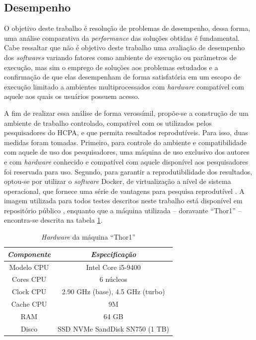 \documentclass[cic,tc]{iiufrgs}
\begin{document}
\subsection{Desempenho}

O objetivo deste trabalho é resolução de problemas de desempenho, dessa forma,
uma análise comparativa da \textit{performance} das soluções obtidas é
fundamental. Cabe ressaltar que não é objetivo deste trabalho uma avaliação de
desempenho dos \textit{softwares} variando fatores como ambiente de execução ou
parâmetros de execução, mas sim o emprego de soluções aos problemas estudados e
a confirmação de que elas desempenham de forma satisfatória em um escopo de
execução limitado a ambientes multiprocessados com \textit{hardware} compatível com
aquele aos quais os usuários possuem acesso.

A fim de realizar essa análise de forma verossímil, propõe-se a construção de
um ambiente de trabalho controlado, compatível com os utilizados pelos
pesquisadores do HCPA, e que permita resultados reprodutíveis. Para isso, duas
medidas foram tomadas. Primeiro, para controle do ambiente e compatibilidade
com aquele de uso dos pesquisadores, uma máquina de uso exclusivo dos autores e
com \textit{hardware} conhecido e compatível com aquele disponível aos
pesquisadores foi reservada para uso. Segundo, para garantir a
reprodutibilidade dos resultados, optou-se por utilizar o \textit{software}
Docker, de virtualização a nível de sistema operacional, que fornece uma série
de vantagens para pesquisa reprodutível \cite{boettiger2015introduction}. A
imagem utilizada para todos testes descritos neste trabalho está disponível em
repositório público \cite{dockerme}, enquanto que a máquina utilizada --
doravante ``Thor1'' -- encontra-se descrita na tabela \ref{tbl:thor1}.

\begin{table}[h]
    \caption{\textit{Hardware} da máquina ``Thor1''}
    \centering
        \begin{tabular}{c|c}
          \hline
          \textit{Componente}  &   \textit{Especificação} \\
          \hline
          \hline
          Modelo CPU & Intel Core i5-9400 \\
          Cores CPU & 6 núcleos\\
          Clock CPU & 2.90 GHz (base), 4.5 GHz (turbo) \\
          Cache CPU & 9M \\
          RAM & 64 GB \\
          Disco & SSD NVMe SandDisk SN750 (1 TB) \\
          \hline
        \end{tabular}
    \label{tbl:thor1}
\end{table}
\end{document}
